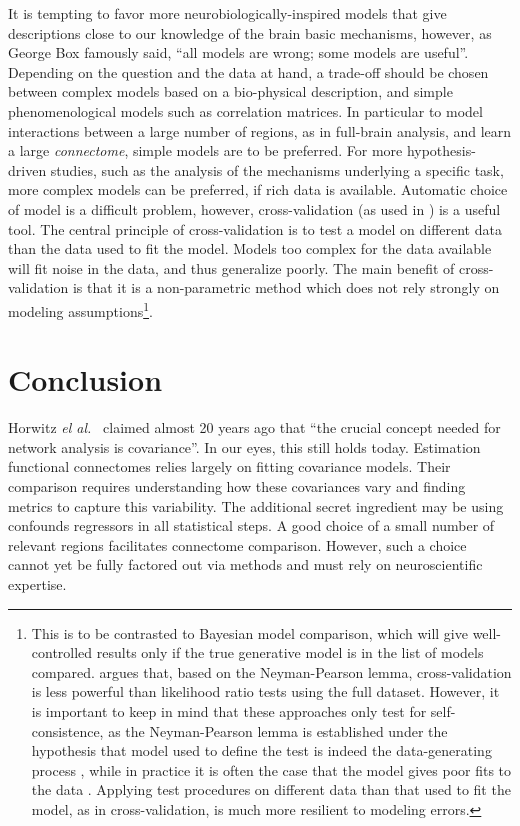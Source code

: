\documentclass[5p]{elsarticle}
\begin{document}
It is tempting to favor more neurobiologically-inspired models that give
descriptions close to our knowledge of the brain basic mechanisms,
however, as George Box famously said, ``all models are wrong; some models
are useful''. Depending on the question and the data at hand, a trade-off 
should be chosen between complex models based on a bio-physical description,
and simple phenomenological models such as correlation matrices. In
particular to model interactions between a large number of regions, as in
full-brain analysis, and learn a large \emph{connectome}, simple models
are to be preferred. For more hypothesis-driven studies, such as the
analysis of the mechanisms underlying a specific task, more complex models
can be preferred, if rich data is available. Automatic choice of model is
a difficult problem, however, cross-validation (as used in
\cite{varoquaux2010c,craddock2012,strother2006}) is a useful tool. The
central principle of cross-validation is to test a model on different
data than the data used to fit the model. Models too complex
for the data available will fit noise in the data, and thus generalize
poorly. The main benefit of cross-validation is that it is a
non-parametric method which does not rely strongly on modeling
assumptions\footnote{This is to be contrasted to Bayesian model
comparison, which will give well-controlled results only if the true generative
model is in the list of models compared. \cite{friston2012} argues that,
based on the Neyman-Pearson lemma, cross-validation is less powerful than
likelihood ratio tests using the full dataset. However, it is
important to keep in mind that these approaches only test for
self-consistence, as the Neyman-Pearson lemma is established under the
hypothesis that model used to define the test is indeed the 
data-generating process
\cite{neyman1933}, while in practice it is often the case that the model
gives poor fits to the data \cite{lohmann2012}. Applying test procedures
on different data than that used to fit the model, as in
cross-validation, is much more resilient to modeling errors.}.



\section{Conclusion}

Horwitz \emph{el al.}\ \cite{horwitz1995} claimed almost 20 years ago
that ``the crucial concept needed for network analysis is covariance''.
In our eyes, this still holds today. Estimation functional connectomes
relies largely on fitting covariance models. Their comparison requires
understanding how these covariances vary and finding metrics to capture
this variability. The additional secret ingredient may be using  
confounds regressors in all statistical steps. A good choice of a small number of
relevant regions facilitates connectome comparison. However, such a
choice cannot yet be fully factored out via methods and must rely on
neuroscientific expertise.
\end{document}

